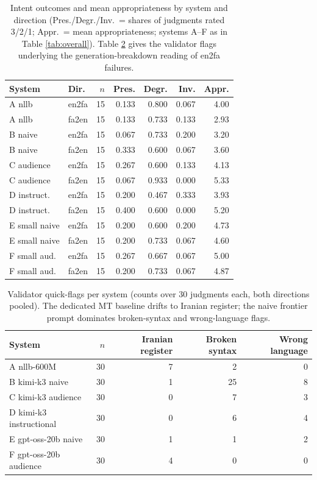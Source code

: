 \documentclass[11pt]{article}
\begin{document}
\begin{table}[t]
\centering\small
\begin{tabular}{llrrrrr}
\toprule
System & Dir. & $n$ & Pres. & Degr. & Inv. & Appr. \\
\midrule
A nllb & en2fa & 15 & 0.133 & 0.800 & 0.067 & 4.00 \\
A nllb & fa2en & 15 & 0.133 & 0.733 & 0.133 & 2.93 \\
B naive & en2fa & 15 & 0.067 & 0.733 & 0.200 & 3.20 \\
B naive & fa2en & 15 & 0.333 & 0.600 & 0.067 & 3.60 \\
C audience & en2fa & 15 & 0.267 & 0.600 & 0.133 & 4.13 \\
C audience & fa2en & 15 & 0.067 & 0.933 & 0.000 & 5.33 \\
D instruct. & en2fa & 15 & 0.200 & 0.467 & 0.333 & 3.93 \\
D instruct. & fa2en & 15 & 0.400 & 0.600 & 0.000 & 5.20 \\
E small naive & en2fa & 15 & 0.200 & 0.600 & 0.200 & 4.73 \\
E small naive & fa2en & 15 & 0.200 & 0.733 & 0.067 & 4.60 \\
F small aud. & en2fa & 15 & 0.267 & 0.667 & 0.067 & 5.00 \\
F small aud. & fa2en & 15 & 0.200 & 0.733 & 0.067 & 4.87 \\
\bottomrule
\end{tabular}
\caption{Intent outcomes and mean appropriateness by system and direction (Pres./Degr./Inv.\ = shares of judgments rated 3/2/1; Appr.\ = mean appropriateness; systems A--F as in Table \ref{tab:overall}). Table \ref{tab:flags} gives the validator flags underlying the generation-breakdown reading of en2fa failures.}
\label{tab:direction}
\end{table}

\begin{table}[t]
\centering\small
\begin{tabular}{lrrrr}
\toprule
System & $n$ & Iranian register & Broken syntax & Wrong language \\
\midrule
A nllb-600M & 30 & 7 & 2 & 0 \\
B kimi-k3 naive & 30 & 1 & 25 & 8 \\
C kimi-k3 audience & 30 & 0 & 7 & 3 \\
D kimi-k3 instructional & 30 & 0 & 6 & 4 \\
E gpt-oss-20b naive & 30 & 1 & 1 & 2 \\
F gpt-oss-20b audience & 30 & 4 & 0 & 0 \\
\bottomrule
\end{tabular}
\caption{Validator quick-flags per system (counts over 30 judgments each, both directions pooled). The dedicated MT baseline drifts to Iranian register; the naive frontier prompt dominates broken-syntax and wrong-language flags.}
\label{tab:flags}
\end{table}
\end{document}
